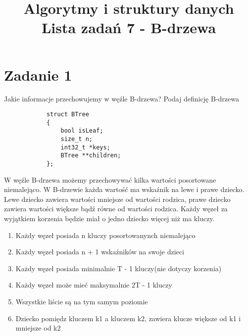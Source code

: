 \documentclass{article}
\title {
    \Huge\textbf{Algorytmy i struktury danych} \\
    \vspace{2mm}
    \huge{Lista zadań 7 - B-drzewa} 
    \date{}
}
\begin{document}
    \maketitle
    \boldmath
    \section*{Zadanie 1}
        Jakie informacje przechowujemy w węźle B-drzewa? Podaj definicję
        B-drzewa

        \begin{lstlisting}
            struct BTree
            {
                bool isLeaf;
                size_t n;
                int32_t *keys;
                BTree **children;
            };
        \end{lstlisting}

        W węźle B-drzewa możemy przechowywać kilka wartości posortowane niemalejąco.
        W B-drzewie każda wartość ma wskaźnik na lewe i prawe dziecko. Lewe dziecko
        zawiera wartości mniejsze od wartości rodzica, prawe dziecko zawiera wartości
        większe bądź równe od wartości rodzica. Każdy węzeł za wyjątkiem korzenia 
        będzie miał o jedno dziecko więcej niż ma kluczy.
        \begin{enumerate}
            \item Każdy węzeł posiada n kluczy posortowanynch niemalejąco
            \item Każdy węzeł posiada n + 1 wskaźników na swoje dzieci
            \item Każdy węzeł posiada minimalnie T - 1 kluczy(nie dotyczy korzenia)
            \item Każdy węzeł może mieć maksymalnie 2T - 1 kluczy
            \item Wszystkie liście są na tym samym poziomie
            \item Dziecko pomiędz kluczem k1 a kluczem k2, zawiera klucze większe
            od k1 i mniejsze od k2
        \end{enumerate} 
    
\end{document}
